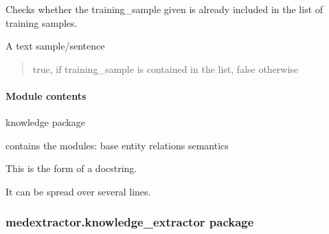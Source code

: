 \documentclass[letterpaper,10pt,english]{sphinxmanual}
\begin{document}
\begin{fulllineitems}

\begin{fulllineitems}
\label{\detokenize{medextractor.knowledge:medextractor.knowledge.semantics.SemanticRelation.contains_training_sample}}
\pysigstartsignatures
{}
\pysigstopsignatures
\sphinxAtStartPar
Checks whether the training\_sample given is already included in the list of training samples.
\begin{description}
\sphinxAtStartPar
A text sample/sentence

\end{description}
\begin{quote}

\sphinxAtStartPar
true, if training\_sample is contained in the list, false otherwise
\end{quote}

\end{fulllineitems}


\end{fulllineitems}



\paragraph{Module contents}
\label{\detokenize{medextractor.knowledge:module-medextractor.knowledge}}\label{\detokenize{medextractor.knowledge:module-contents}}
\sphinxAtStartPar
knowledge package

\sphinxAtStartPar
contains the modules:
base
entity
relations
semantics

\sphinxAtStartPar
This is the form of a docstring.

\sphinxAtStartPar
It can be spread over several lines.

\sphinxstepscope


\subsubsection{medextractor.knowledge\_extractor package}
\label{\detokenize{medextractor.knowledge_extractor:medextractor-knowledge-extractor-package}}\label{\detokenize{medextractor.knowledge_extractor::doc}}
\end{document}
